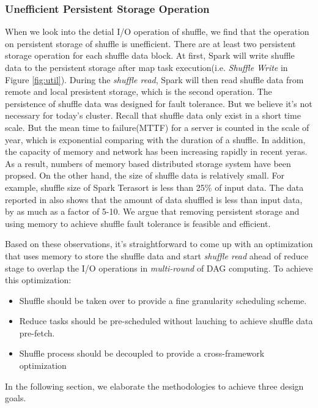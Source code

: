 \subsubsection{Unefficient Persistent Storage Operation}
When we look into the detial I/O operation of shuffle, we find that the operation on persistent storage of shuffle is unefficient. There are at least two persistent storage operation for each shuffle data block. At first, Spark will write shuffle data to the persistent storage after map task execution(i.e. \textit{Shuffle Write} in Figure \ref{fig:util}). During the \textit{shuffle read}, Spark will then read shuffle data from remote and local presistent storage, which is the second operation. The persistence of shuffle data was designed for fault tolerance. But we believe it's not necessary for today's cluster. Recall that shuffle data only exist in a short time scale. But the mean time to failure(MTTF) for a server is counted in the scale of year\cite{tachyon}, which is exponential comparing with the duration of a shuffle. In addition, the capacity of memory and network has been increasing rapidly in recent yeras. As a result, numbers of memory based distributed storage system have been propsed\cite{memcached, tachyon, ramcloud}. On the other hand, the size of shuffle data is relatively small. For example, shuffle size of Spark Terasort\cite{spark-tera} is less than 25\% of input data. The data reported in \cite{makingsense} also shows that the amount of data shuffled is less than input data, by as much as a factor of 5-10. We argue that removing persistent storage and using memory to achieve shuffle fault tolerance is feasible and efficient.

Based on these observations, it's straightforward to come up with an optimization that uses memory to store the shuffle data and start \textit{shuffle read} ahead of reduce stage to overlap the I/O operations in \textit{multi-round} of DAG computing. To achieve this optimization:
\begin{itemize}
	\item Shuffle should be taken over to provide a fine granularity scheduling scheme.
	\item Reduce tasks should be pre-scheduled without lauching to achieve shuffle data pre-fetch.
	\item Shuffle process should be decoupled to provide a cross-framework optimization
\end{itemize} 
In the following section, we elaborate the methodologies to achieve three design goals.
